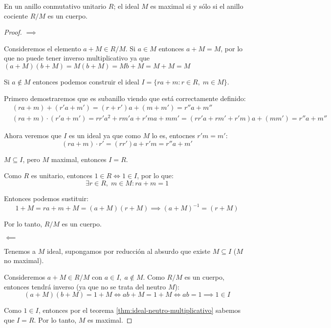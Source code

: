 \begin{thm}
    En un anillo conmutativo unitario $R$; el ideal $M$ es maximal si y sólo si el anillo cociente $R/M$ es un cuerpo.
    \label{thm:maximal-cuerpo}
\end{thm}

\begin{proof}
    $\implies$
    
    Consideremos el elemento $a+M \in R / M$. Si $a \in M$ entonces $a + M = M$, por lo que no puede tener inverso multiplicativo ya que $(a+M)(b+M) = M(b+M) = Mb + M = M + M = M$

    Si $a \not\in M$ entonces podemos construir el ideal $I = \{ra + m : r \in R, \; m \in M\}$.

    Primero demostraremos que es subanillo viendo que está correctamente definido:
    \begin{equation}
        \begin{split}
            & (ra+m)+(r'a+m') = (r+r')a + (m+m') = r''a + m''\\
            & (ra+m) \cdot (r'a+m') = rr'a^2 + rm'a + r'ma + mm' = (rr'a + rm' + r'm)a + (mm') = r''a + m''
        \end{split}
    \end{equation}

    Ahora veremos que $I$ es un ideal ya que como $M$ lo es, entocnes $r'm = m'$:
    \begin{equation}
        (ra + m) \cdot r' = (rr')a + r'm = r''a + m'
    \end{equation}

    $M \subseteq I$, pero $M$ maximal, entonces $I = R$.
    
    Como $R$ es unitario, entonces $1 \in R \iff 1 \in I$, por lo que:
    \begin{equation}
        \exists r \in R, \; m \in M: ra + m = 1
    \end{equation}

    Entonces podemos sustituir:
    \begin{equation}
        1 + M = ra + m + M = (a + M)(r + M) \implies (a + M)^{-1} = (r + M) 
    \end{equation}

    Por lo tanto, $R / M$ es un cuerpo.

    $\impliedby$

    Tenemos a $M$ ideal, supongamos por reducción al absurdo que existe $M \subseteq I$ ($M$ no maximal).

    Consideremos $a + M \in R / M$ con $a \in I, \; a \not\in M$. Como $R / M$ es un cuerpo, entonces tendrá inverso (ya que no se trata del neutro $M$):
    \begin{equation}
        (a + M)(b + M) = 1 + M \iff ab + M = 1 + M \iff ab = 1 \implies 1 \in I
    \end{equation}

    Como $1 \in I$, entonces por el teorema \ref{thm:ideal-neutro-multiplicativo} sabemos que $I = R$. Por lo tanto, $M$ es maximal.
\end{proof}
